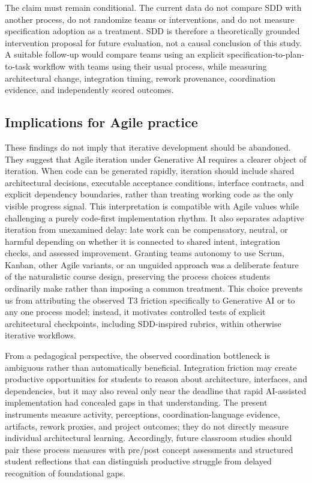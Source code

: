 The claim must remain conditional. The current data do not compare SDD with
another process, do not randomize teams or interventions, and do not measure
specification adoption as a treatment. SDD is therefore a theoretically
grounded intervention proposal for future evaluation, not a causal conclusion
of this study. A suitable follow-up would compare teams using an explicit
specification-to-plan-to-task workflow with teams using their usual process,
while measuring architectural change, integration timing, rework provenance,
coordination evidence, and independently scored outcomes.

\subsection{Implications for Agile practice}

These findings do not imply that iterative development should be abandoned.
They suggest that Agile iteration under Generative AI requires a clearer object
of iteration. When code can be generated rapidly, iteration should include
shared architectural decisions, executable acceptance conditions, interface
contracts, and explicit dependency boundaries, rather than treating working
code as the only visible progress signal. This interpretation is compatible
with Agile values while challenging a purely code-first implementation rhythm.
It also separates adaptive iteration from unexamined delay: late work can be
compensatory, neutral, or harmful depending on whether it is connected to
shared intent, integration checks, and assessed improvement.
Granting teams autonomy to use Scrum, Kanban, other Agile variants, or an
unguided approach was a deliberate feature of the naturalistic course design,
preserving the process choices students ordinarily make rather than imposing a
common treatment. This choice prevents us from attributing the observed T3
friction specifically to Generative AI or to any one process model; instead, it
motivates controlled tests of explicit architectural checkpoints, including
SDD-inspired rubrics, within otherwise iterative workflows.

From a pedagogical perspective, the observed coordination bottleneck is
ambiguous rather than automatically beneficial. Integration friction may
create productive opportunities for students to reason about architecture,
interfaces, and dependencies, but it may also reveal only near the deadline
that rapid AI-assisted implementation had concealed gaps in that
understanding. The present instruments measure activity, perceptions,
coordination-language evidence, artifacts, rework proxies, and project
outcomes; they do not directly measure individual architectural learning.
Accordingly, future classroom studies should pair these process measures with
pre/post concept assessments and structured student reflections that can
distinguish productive struggle from delayed recognition of foundational
gaps.

